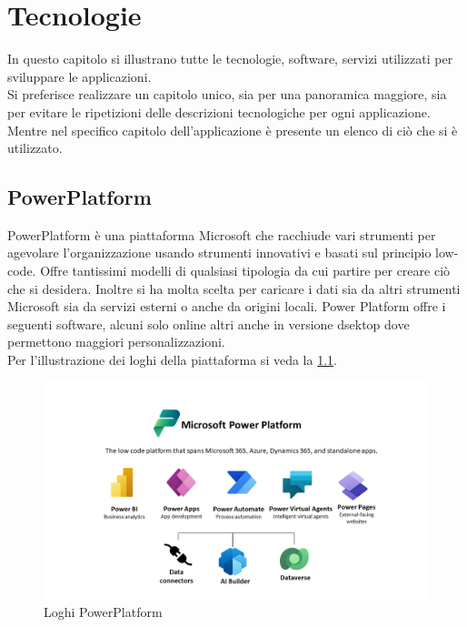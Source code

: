 \chapter{Tecnologie}
In questo capitolo si illustrano tutte le tecnologie, software, servizi utilizzati per sviluppare le applicazioni.\\
Si preferisce realizzare un capitolo unico, sia per una panoramica maggiore, sia per evitare le ripetizioni delle descrizioni tecnologiche per ogni applicazione.
Mentre nel specifico capitolo dell'applicazione è presente un elenco di ciò che si è utilizzato.
\section{PowerPlatform} \label{tec:PowerPlatform}
PowerPlatform è una piattaforma Microsoft che racchiude vari strumenti per agevolare l’organizzazione usando strumenti innovativi e basati sul principio low-code.
Offre tantissimi modelli di qualsiasi tipologia da cui partire per creare ciò che si desidera.
Inoltre si ha molta scelta per caricare i dati sia da altri strumenti Microsoft sia da servizi esterni o anche da origini locali. \newline
Power Platform offre i seguenti software, alcuni solo online altri anche in versione dsektop dove permettono maggiori personalizzazioni.\\
Per l'illustrazione dei loghi della piattaforma si veda la \figurename \space \ref*{fig:PowerPlatform}.
\begin{figure}[h]
    \centering\includegraphics[width=\textwidth, height=\textheight,keepaspectratio]{immagini/Icone-PowerPlatform.png}
    \caption{Loghi PowerPlatform}
    \label{fig:PowerPlatform}
\end{figure}
